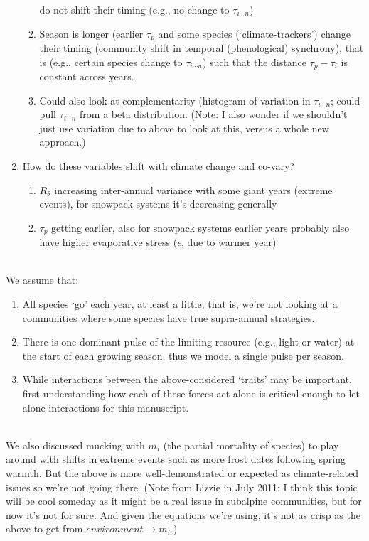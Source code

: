 \documentclass[11pt,a4paper,oneside]{article}
\begin{document}
\begin{enumerate}
\begin{enumerate}
  do not shift their timing (e.g., no change to  \(\tau_{i \cdots
    n}\)) 
\item Season is longer (earlier \(\tau_{p}\) and some species (`climate-trackers') change
  their timing (community shift in temporal (phenological) synchrony),
  that is (e.g., certain species change to  \(\tau_{i \cdots
    n}\)) such that the distance \(\tau_{p}-\tau_{i}\) is constant
  across years.
\item Could also look at complementarity (histogram of variation in \(\tau_{i \cdots
    n}\); could pull \(\tau_{i \cdots
    n}\) from a beta distribution. (Note: I also wonder if we
  shouldn't just use variation due to above to look at this, versus a
  whole new approach.)
\end{enumerate}
\item How do these variables shift with climate change and co-vary?
\begin{enumerate} 
\item \(R_{\theta}\) increasing inter-annual variance with some giant
  years (extreme events), for snowpack systems it's decreasing
  generally
\item \(\tau_{p}\) getting earlier, also for snowpack systems earlier
  years probably also have higher evaporative stress (\(\epsilon\),
  due to warmer year)
\end{enumerate}
\end{enumerate}
\\
\noindent We assume that:
\begin{enumerate}
\item All species `go' each year, at least a little; that is, we're
  not looking at a communities where some species have true
  supra-annual strategies.
\item There is one dominant pulse of the limiting resource (e.g.,
  light or water) at the
  start of each growing season; thus we model a  single pulse per
  season.
\item While interactions between the above-considered `traits' may be
  important, first understanding how each of these forces act alone is
  critical enough to let alone interactions for this manuscript.
\end{enumerate}
\\
\noindent We also discussed mucking with \(m_{i}\) (the partial
mortality of species) to play around with
shifts in extreme events such as more frost dates following spring
warmth. But the above is more well-demonstrated or expected as
climate-related issues so we're not going there. (Note from Lizzie in
July 2011: I think this topic will be cool someday as it might be a
real issue in subalpine communities, but for now it's not for
sure. And given the equations we're using, it's not as crisp as the
above to get from \(environment\rightarrow m_{i}\).)
\\
\end{document}
